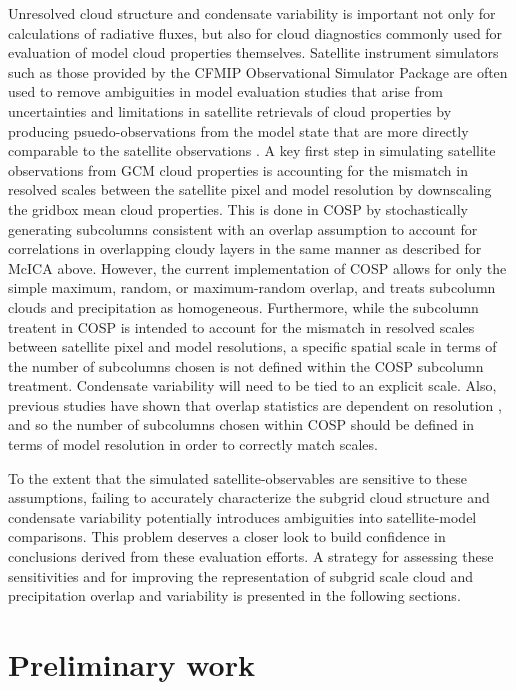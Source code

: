 \documentclass[letter]{article}
\begin{document}
Unresolved cloud structure and condensate variability is important not only for calculations of radiative fluxes, but also for cloud diagnostics commonly used for evaluation of model cloud properties themselves. Satellite instrument simulators such as those provided by the CFMIP Observational Simulator Package \citep[COSP;][]{bodas-salcedo_et_al_2011} are often used to remove ambiguities in model evaluation studies that arise from uncertainties and limitations in satellite retrievals of cloud properties by producing psuedo-observations from the model state that are more directly comparable to the satellite observations \citep[e.g.,][]{klein_and_jakob_1999,webb_et_al_2001,zhang_et_al_2005,zhang_et_al_2010,kay_et_al_2012,klein_et_al_2013}. A key first step in simulating satellite observations from GCM cloud properties is accounting for the mismatch in resolved scales between the satellite pixel and model resolution by downscaling the gridbox mean cloud properties. This is done in COSP by stochastically generating subcolumns consistent with an overlap assumption to account for correlations in overlapping cloudy layers in the same manner as described for McICA above. However, the current implementation of COSP allows for only the simple maximum, random, or maximum-random overlap, and treats subcolumn clouds and precipitation as homogeneous. Furthermore, while the subcolumn treatent in COSP is intended to account for the mismatch in resolved scales between satellite pixel and model resolutions, a specific spatial scale in terms of the number of subcolumns chosen is not defined within the COSP subcolumn treatment. Condensate variability will need to be tied to an explicit scale. Also, previous studies have shown that overlap statistics are dependent on resolution \citep[e.g.,][]{mace_and_benson-troth_2002}, and so the number of subcolumns chosen within COSP should be defined in terms of model resolution in order to correctly match scales.

To the extent that the simulated satellite-observables are sensitive to these assumptions, failing to accurately characterize the subgrid cloud structure and condensate variability potentially introduces ambiguities into satellite-model comparisons. This problem deserves a closer look to build confidence in conclusions derived from these evaluation efforts. A strategy for assessing these sensitivities and for improving the representation of subgrid scale cloud and precipitation overlap and variability is presented in the following sections.

\section{Preliminary work}
\end{document}
